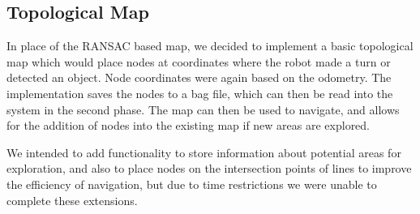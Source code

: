 \documentclass[10pt,a4paper,twocolumn]{article}
\begin{document}
\subsection{Topological Map}
In place of the RANSAC based map, we decided to implement a basic topological
map which would place nodes at coordinates where the robot made a turn or
detected an object. Node coordinates were again based on the odometry. The
implementation saves the nodes to a bag file, which can then be read into the
system in the second phase. The map can then be used to navigate, and allows for
the addition of nodes into the existing map if new areas are explored.

We intended to add functionality to store information about potential areas for
exploration, and also to place nodes on the intersection points of lines to
improve the efficiency of navigation, but due to time restrictions we were
unable to complete these extensions.
\end{document}
